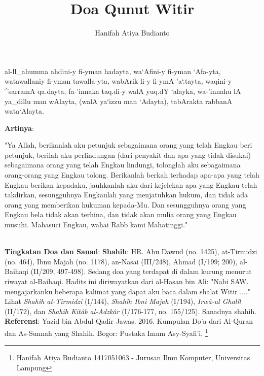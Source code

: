 \documentclass[a4paper,12pt]{article}
\title{\Large Doa Qunut Witir}
\author{\calligra Hanifah Atiya Budianto}
\begin{document}
\sffamily
\maketitle 
\fullvocalize
{}
\begin{arabtext}
\noindent
al-ll_ahumma ahdini-y fi-yman hadayta, wa`Afini-y fi-yman `Afa-yta, 
watawallaniy fi-yman tawalla-yta, wabArik li-y fi-ymA 'a`.tayta, waqini-y 
^sarramA qa.dayta, fa-'innaka taq.di-y walA yuq.dY `alayka, wa-'innahu lA 
ya_dillu man wAlayta, (walA ya`izzu man `Adayta), tabArakta rabbanA 
wata`Alayta.\\
\end{arabtext}
\noindent
\textbf{Artinya}:
\par
\indent
"Ya Allah, berikanlah aku petunjuk sebagaimana orang yang telah Engkau beri
petunjuk, berilah aku perlindungan (dari penyakit dan apa yang tidak 
disukai) sebagaimana orang yang telah Engkau lindungi, tolonglah aku 
sebagaimana orang-orang yang Engkau tolong. Berikanlah berkah terhadap 
apa-apa yang telah Engkau berikan kepadaku, jauhkanlah aku dari kejelekan 
apa yang Engkau telah takdirkan, sesungguhnya Engkaulah yang menjatuhkan 
hukum, dan tidak ada orang yang memberikan hukuman kepada-Mu. Dan 
sesungguhnya orang yang Engkau bela tidak akan terhina, dan tidak akan 
mulia orang yang Engkau musuhi. Mahasuci Engkau, wahai Rabb kami  
Mahatinggi."\\\\
\par
\noindent
\textbf{Tingkatan Doa dan Sanad}: \textbf{Shahih}: HR. Abu Dawud (no. 
1425), at-Tirmidzi (no. 464), Ibnu Majah (no. 1178), an-Nasai (III/248), 
Ahmad (I/199; 200), al-Baihaqi (II/209, 497-498). Sedang doa yang terdapat 
di dalam kurung menurut riwayat al-Baihaqi. Hadits ini diriwayatkan dari 
al-Hasan bin Ali: "Nabi SAW. mengajarkanku beberapa kalimat yang dapat aku 
baca dalam shalat Witir ...." Lihat \textit{Shah\^{i}h at-Tirmidzi} 
(I/144), \textit{Shah\^{i}h Ibni Majah} (I/194), \textit{Irw\^{a}-ul 
Ghal\^{i}l} (II/172), dan \textit{Shah\^{i}h Kit\^{a}b al-Adzk\^{a}r} 
(I/176-177, no. 155/125). Sanadnya shahih.\\
\textbf{Referensi}: Yazid bin Abdul Qadir Jawas. 2016. Kumpulan Do'a dari
Al-Quran dan As-Sunnah yang Shahih. Bogor: Pustaka Imam Asy-Syafi'i.
\footnote{Hanifah Atiya Budianto 1417051063 - Jurusan Ilmu Komputer,
Universitas Lampung}
\end{document}
